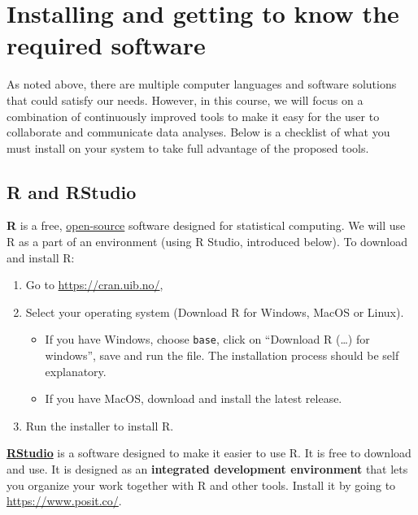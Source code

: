 \documentclass[
  11pt,
  letterpaper,
]{scrbook}
\providecommand{\tightlist}{%
  \setlength{\itemsep}{0pt}\setlength{\parskip}{0pt}}\usepackage{longtable,booktabs,array}
\begin{document}
\hypertarget{installing-and-getting-to-know-the-required-software}{%
\section{Installing and getting to know the required
software}\label{installing-and-getting-to-know-the-required-software}}

As noted above, there are multiple computer languages and software
solutions that could satisfy our needs. However, in this course, we will
focus on a combination of continuously improved tools to make it easy
for the user to collaborate and communicate data analyses. Below is a
checklist of what you must install on your system to take full advantage
of the proposed tools.

\hypertarget{r-and-rstudio}{%
\subsection{R and RStudio}\label{r-and-rstudio}}

\textbf{R} is a free,
\href{https://en.wikipedia.org/wiki/Open_source}{open-source} software
designed for statistical computing. We will use R as a part of an
environment (using R Studio, introduced below). To download and install
R:

\begin{enumerate}
\def\labelenumi{\arabic{enumi}.}
\item
  Go to \url{https://cran.uib.no/},
\item
  Select your operating system (Download R for Windows, MacOS or Linux).

  \begin{itemize}
  \tightlist
  \item
    If you have Windows, choose \texttt{base}, click on ``Download R
    (\ldots) for windows'', save and run the file. The installation
    process should be self explanatory.
  \item
    If you have MacOS, download and install the latest release.
  \end{itemize}
\item
  Run the installer to install R.
\end{enumerate}

\textbf{\href{https://www.posit.co/}{RStudio}} is a software designed to
make it easier to use R. It is free to download and use. It is designed
as an \textbf{integrated development environment} that lets you organize
your work together with R and other tools. Install it by going to
\url{https://www.posit.co/}.
\end{document}
